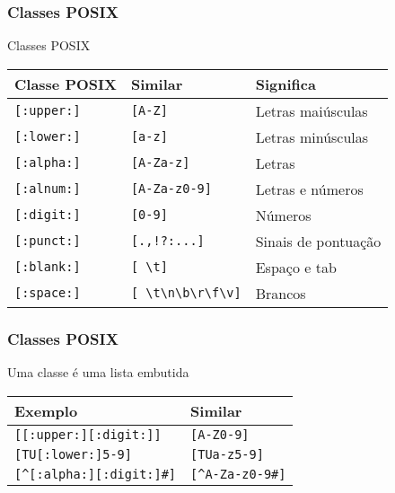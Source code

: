 \documentclass{beamer}
\begin{document}
\begin{frame}[fragile]
 \frametitle{Classes POSIX}
 \begin{block}{Classes POSIX}
  \begin{center}
   \begin{tabular}{|l|l|l|}
	\hline
	\textbf{Classe POSIX} & \textbf{Similar} & \textbf{Significa} \\
	\hline
	\texttt{[:upper:]} & \texttt{[A-Z]} & Letras maiúsculas \\
	\hline
	\texttt{[:lower:]} & \texttt{[a-z]} & Letras minúsculas \\
	\hline
	\texttt{[:alpha:]} & \texttt{[A-Za-z]} & Letras \\
	\hline
	\texttt{[:alnum:]} & \texttt{[A-Za-z0-9]} & Letras e números \\
	\hline
	\texttt{[:digit:]} & \texttt{[0-9]} & Números \\
	\hline
	\texttt{[:punct:]} & \texttt{[.,!?:...]} & Sinais de pontuação \\
	\hline
	\texttt{[:blank:]} & \verb=[ \t]= & Espaço e tab \\
	\hline
	\texttt{[:space:]} & \verb=[ \t\n\b\r\f\v]= & Brancos \\
	\hline
   \end{tabular}
  \end{center}
 \end{block}
\end{frame}

\begin{frame}
 \frametitle{Classes POSIX}
 \begin{block}{Uma classe é uma lista embutida}
  \begin{center}
   \begin{tabular}{|l|l|}
	\hline
	\textbf{Exemplo} & \textbf{Similar} \\
	\hline
	\texttt{[[:upper:][:digit:]]} & \texttt{[A-Z0-9]} \\
	\hline
	\texttt{[TU[:lower:]5-9]} & \texttt{[TUa-z5-9]} \\
	\hline
	\texttt{[\^{}[:alpha:][:digit:]\#]} & \texttt{[\^{}A-Za-z0-9\#]} \\
	\hline
   \end{tabular}
  \end{center}
 \end{block}
\end{frame}
\end{document}
